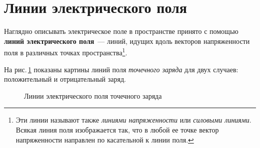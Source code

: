 \documentclass[main.tex]{subfiles}
\begin{document}

\pagestyle{empty}

 

\setcounter{section}{7
}
\addtocounter{section}{-1} 

\section{Линии электрического поля}


Наглядно описывать электрическое поле в пространстве принято с помощью \textbf{линий электрического поля}~--- линий, идущих вдоль векторов напряженности поля в различных точках пространства\footnote{Эти линии называют также \emph{линиями напряженности} или \emph{силовыми линиями}. Всякая линия поля изображается так, что в любой ее точке вектор напряженности направлен по касательной к линии поля.}.

На рис.\,\ref{fig:p99} показаны картины линий поля \emph{точечного заряда} для двух случаев: положительный и отрицательный заряд.

    \begin{figure}[H]
    \centering

\caption{Линии электрического поля точечного заряда}
\label{fig:p99}
\end{figure}
\end{document}
